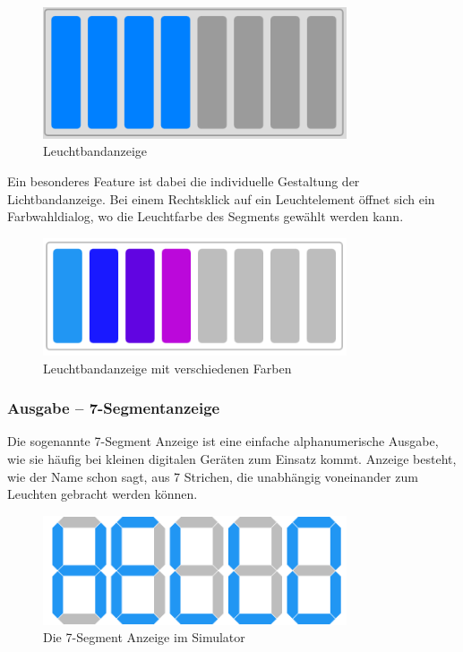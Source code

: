 \begin{figure}[ht]
	\centering
  \includegraphics[width=0.8\textwidth]{Images/Lightstrip}
	\caption{Leuchtbandanzeige}
	\label{Lightstrip}
\end{figure}

Ein besonderes Feature ist dabei die individuelle Gestaltung der Lichtbandanzeige. Bei einem Rechtsklick auf ein Leuchtelement öffnet sich ein Farbwahldialog, wo die Leuchtfarbe des Segments gewählt werden kann.

\begin{figure}[ht]
	\centering
  \includegraphics[width=0.8\textwidth]{Images/Lightstrip_colors}
	\caption{Leuchtbandanzeige mit verschiedenen Farben}
	\label{Lightstrip_Colors}
\end{figure}


\subsubsection{Ausgabe -- 7-Segmentanzeige}
Die sogenannte 7-Segment Anzeige ist eine einfache alphanumerische Ausgabe,
wie sie häufig bei kleinen digitalen Geräten zum Einsatz kommt.
Anzeige besteht, wie der Name schon sagt, aus 7 Strichen, die unabhängig voneinander zum Leuchten gebracht werden können.

\begin{figure}[ht]
	\centering
  \includegraphics[width=0.8\textwidth]{Images/7-Segment_Hello}
	\caption{Die 7-Segment Anzeige im Simulator}
	\label{7-Segment}
\end{figure}

